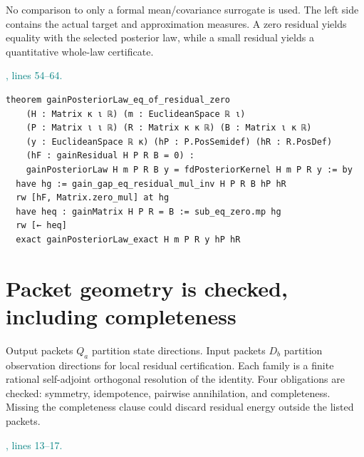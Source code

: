 \documentclass[11pt]{article}\usepackage{needspace}\renewcommand{\paperkind}{Lean companion}\setlength{\parskip}{0.35em}
\begin{document}
No comparison to only a formal mean/covariance surrogate is used. The left side contains the actual target and approximation measures. A zero residual yields equality with the selected posterior law, while a small residual yields a quantitative whole-law certificate.



{\small\textcolor{teal}{, lines 54--64.}\par}

\begin{lstlisting}[style=BayesSource]
theorem gainPosteriorLaw_eq_of_residual_zero
    (H : Matrix κ ι ℝ) (m : EuclideanSpace ℝ ι)
    (P : Matrix ι ι ℝ) (R : Matrix κ κ ℝ) (B : Matrix ι κ ℝ)
    (y : EuclideanSpace ℝ κ) (hP : P.PosSemidef) (hR : R.PosDef)
    (hF : gainResidual H P R B = 0) :
    gainPosteriorLaw H m P R B y = fdPosteriorKernel H m P R y := by
  have hg := gain_gap_eq_residual_mul_inv H P R B hP hR
  rw [hF, Matrix.zero_mul] at hg
  have heq : gainMatrix H P R = B := sub_eq_zero.mp hg
  rw [← heq]
  exact gainPosteriorLaw_exact H m P R y hP hR
\end{lstlisting}

\section{Packet geometry is checked, including completeness}

Output packets $Q_a$ partition state directions. Input packets $D_b$ partition observation directions for local residual certification. Each family is a finite rational self-adjoint orthogonal resolution of the identity. Four obligations are checked: symmetry, idempotence, pairwise annihilation, and completeness. Missing the completeness clause could discard residual energy outside the listed packets.



{\small\textcolor{teal}{, lines 13--17.}\par}
\end{document}
